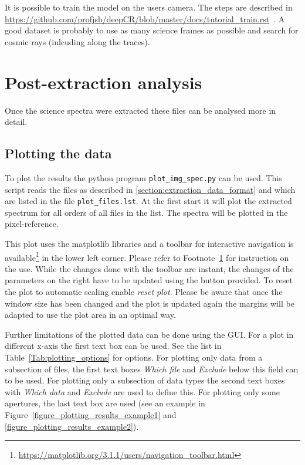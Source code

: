 \documentclass[10pt,a4paper]{article}
\begin{document}
It is possible to train the model on the users camera. The steps are described in 
\url{https://github.com/profjsb/deepCR/blob/master/docs/tutorial_train.rst}~. A good dataset is probably to use as many science frames as possible and search for cosmic rays (inlcuding along the traces).



\newpage
\section{Post-extraction analysis}

\noindent Once the science spectra were extracted these files can be analysed more in detail. 

\subsection{Plotting the data}
\label{Section:Plotting_extracted_files}
To plot the results the python program \verb|plot_img_spec.py| can be used. This script reads the files as described in \ref{section:extraction_data_format} and which are listed in the file \verb|plot_files.lst|. At the first start it will plot the extracted spectrum for all orders of all files in the list. The spectra will be plotted in the pixel-reference.

This plot uses the matplotlib libraries and a toolbar for interactive navigation is available\footnote{\label{Footnote:matplotlib_toolbar} \url{https://matplotlib.org/3.1.1/users/navigation_toolbar.html}} in the lower left corner. Please refer to Footnote~\ref{Footnote:matplotlib_toolbar} for instruction on the use. While the changes done with the toolbar are instant, the changes of the parameters on the right have to be updated using the button provided. To reset the plot to automatic scaling enable \textit{reset plot}. Please be aware that once the window size has been changed and the plot is updated again the margins will be adapted to use the plot area in an optimal way.

Further limitations of the plotted data can be done using the GUI. For a plot in different x-axis the first text box can be used. See the list in Table~\ref{Tab:plotting_options} for options. For plotting only data from a subsection of files, the first text boxes \textit{Which file} and \textit{Exclude} below this field can to be used. For plotting only a subsection of data types the second text boxes with \textit{Which data} and \textit{Exclude} are used to define this. For plotting only some apertures, the last text box are used (see an example in Figure~\ref{figure_plotting_results_example1} and \ref{figure_plotting_results_example2}).
\end{document}
